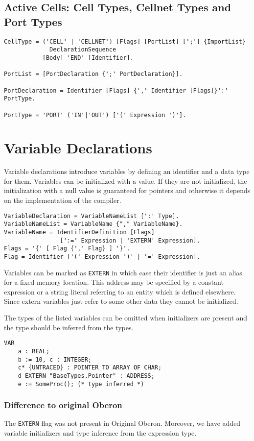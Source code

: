 \documentclass[a4wide,11pt]{article}
\begin{document}
\subsection{Active Cells: Cell Types, Cellnet Types and Port Types}

\begin{lstlisting}[style=ebnf]
CellType = ('CELL' | 'CELLNET') [Flags] [PortList] [';'] {ImportList}
             DeclarationSequence
           [Body] 'END' [Identifier].

PortList = [PortDeclaration {';' PortDeclaration}].

PortDeclaration = Identifier [Flags] {',' Identifier [Flags]}':' PortType.

PortType = 'PORT' ('IN'|'OUT') ['(' Expression ')'].

\end{lstlisting}

\section{Variable Declarations}

Variable declarations introduce variables by defining an identifier and a data type for them.
Variables can be initialized with a value.
If they are not initialized, the initialization with a null value is guaranteed for pointers and otherwise it depends on the implementation of the compiler.

\begin{lstlisting}[style=ebnf]
VariableDeclaration = VariableNameList [':' Type].
VariableNameList = VariableName {"," VariableName}.
VariableName = IdentifierDefinition [Flags]
                [':=' Expression | 'EXTERN' Expression].
Flags = '{' [ Flag {',' Flag} ] '}'.
Flag = Identifier ['(' Expression ')' | '=' Expression].
\end{lstlisting}

Variables can be marked as \lstinline"EXTERN" in which case their identifier is just an alias for a fixed memory location.
This address may be specified by a constant expression or a string literal referring to an entity which is defined elsewhere.
Since extern variables just refer to some other data they cannot be initialized.

The types of the listed variables can be omitted when initializers are present and the type should be inferred from the types.
\begin{annotation}
\begin{lstlisting}[style=example]
VAR
	a : REAL;
	b := 10, c : INTEGER;
	c* {UNTRACED} : POINTER TO ARRAY OF CHAR;
	d EXTERN "BaseTypes.Pointer" : ADDRESS;
	e := SomeProc(); (* type inferred *)
\end{lstlisting}

\subsubsection{Difference to original Oberon}
The \lstinline"EXTERN" flag was not present in Original Oberon. Moreover, we have added variable initializers and type inference from the expression type.
\end{annotation}
\end{document}
